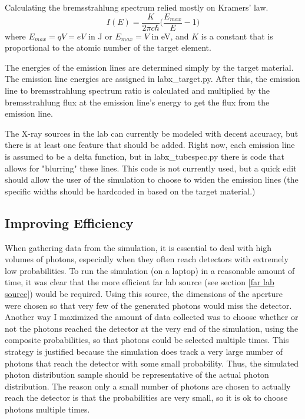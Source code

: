 \documentclass[manuscript]{aastex}
\begin{document}
Calculating the bremsstrahlung spectrum relied mostly on Kramers' law.
\begin{equation}
I(E) = \frac{K} {2\pi c\hbar} \Big(\frac {E_{max}} {E} - 1\Big)
\end{equation}
where $E_{max} = qV = eV$ in J or $E_{max} = V$ in eV, and $K$ is a constant that is proportional to the atomic number of the target element.

The energies of the emission lines are determined simply by the target material. The emission line energies are assigned in labx\_target.py. After this, the emission line to bremsstrahlung spectrum ratio is calculated and multiplied by the bremsstrahlung flux at the emission line's energy to get the flux from the emission line.

The X-ray sources in the lab can currently be modeled with decent accuracy, but there is at least one feature that should be added. Right now, each emission line is assumed to be a delta function, but in labx\_tubespec.py there is code that allows for "blurring" these lines. This code is not currently used, but a quick edit should allow the user of the simulation to choose to widen the emission lines (the specific widths should be hardcoded in based on the target material.)

\subsection{Improving Efficiency}

When gathering data from the simulation, it is essential to deal with high volumes of photons, especially when they often reach detectors with extremely low probabilities. To run the simulation (on a laptop) in a reasonable amount of time, it was clear that the more efficient far lab source (see section \ref{far lab source}) would be required. Using this source, the dimensions of the aperture were chosen so that very few of the generated photons would miss the detector. Another way I maximized the amount of data collected was to choose whether or not the photons reached the detector at the very end of the simulation, using the composite probabilities, so that photons could be selected multiple times. This strategy is justified because the simulation does track a very large number of photons that reach the detector with some small probability. Thus, the simulated photon distribution sample should be representative of the actual photon distribution. The reason only a small number of photons are chosen to actually reach the detector is that the probabilities are very small, so it is ok to choose photons multiple times.
\end{document}

